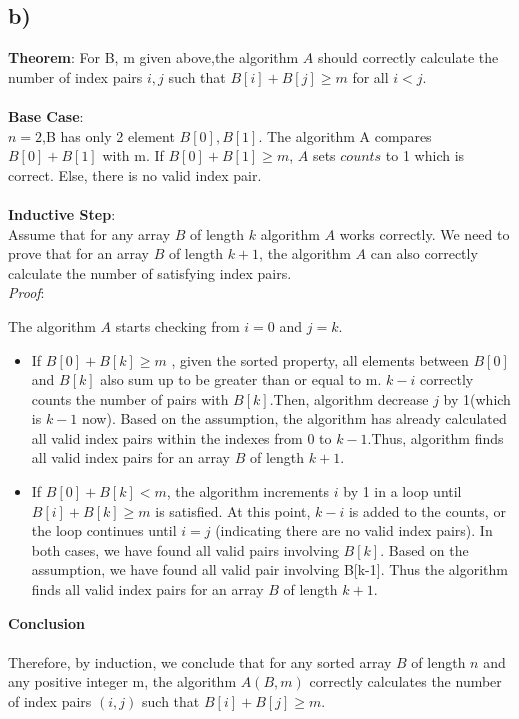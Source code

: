 \documentclass[12pt]{article}
\begin{document}
\subsection*{b)}
\textbf{Theorem}: For B, m given above,the algorithm $A$ should correctly
calculate the number of index pairs $i, j$ such that $B[i] + B[j] \geq m$
for all $i < j$.\\\\
\textbf{Base Case}: \\
$n = 2$,B has only 2 element $B[0], B[1]$. The algorithm A compares $B[0]
+ B[1]$ with m. If $B[0] + B[1] \geq m$, $A$ sets $counts$ to 1 which is 
correct. Else, there is no valid index pair.\\\\
\textbf{Inductive Step}:\\
Assume that for any array $B$ of length $k$ algorithm $A$ works correctly.
We need to prove that for an array $B$ of length $k+1$, the algorithm $A$
can also correctly calculate the number of satisfying index pairs.\\
\textit{Proof}:

The algorithm $A$ starts checking from $i = 0$ and $j = k$.
\begin{itemize}
    \item If $B[0] + B[k] \geq m$ , given the sorted property,  all elements 
    between $B[0]$ and $B[k]$ also sum up to be greater than or equal to m. $k-i$ correctly counts the number of pairs
    with $B[k]$.Then, algorithm decrease $j$ by 1(which is $k-1$ now).
    Based on the assumption, the algorithm has already calculated all 
    valid index pairs within the indexes from $0$ to $k-1$.Thus, algorithm finds all 
    valid index pairs for an array $B$ of length $k+1$.

    \item If $B[0] + B[k] < m$, the algorithm increments \(i\) 
    by 1 in a loop until \(B[i] + B[k] \geq m\) is satisfied. 
    At this point, \(k-i\) is added to the counts, or the loop continues 
    until \(i = j\) (indicating there are no valid index pairs). In both 
    cases, we have found all valid pairs involving $B[k]$. Based 
    on the assumption, we have found all valid pair involving B[k-1].
    Thus the algorithm finds all valid index pairs for an 
    array $B$ of length $k+1$.
    

    \end{itemize}
\textbf{Conclusion}\\\\
Therefore, by induction, we conclude that for any sorted array $B$ of 
length $n$ and any positive integer m, the algorithm $A(B, m)$ correctly 
calculates the number of index pairs $(i, j)$ such that $B[i] + B[j] 
\geq m$.
\end{document}
